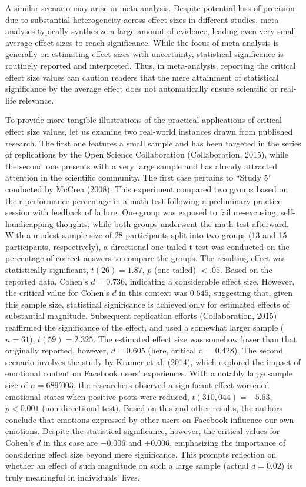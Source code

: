 \documentclass[
  man]{apa7}
\begin{document}
A similar scenario may arise in meta-analysis. Despite potential loss of precision due to substantial heterogeneity across effect sizes in different studies, meta-analyses typically synthesize a large amount of evidence, leading even very small average effect sizes to reach significance. While the focus of meta-analysis is generally on estimating effect sizes with uncertainty, statistical significance is routinely reported and interpreted. Thus, in meta-analysis, reporting the critical effect size values can caution readers that the mere attainment of statistical significance by the average effect does not automatically ensure scientific or real-life relevance.

To provide more tangible illustrations of the practical applications of critical effect size values, let us examine two real-world instances drawn from published research. The first one features a small sample and has been targeted in the series of replications by the Open Science Collaboration (Collaboration, 2015), while the second one presents with a very large sample and has already attracted attention in the scientific community. The first case pertains to ``Study 5'' conducted by McCrea (2008). This experiment compared two groups based on their performance percentage in a math test following a preliminary practice session with feedback of failure. One group was exposed to failure-excusing, self-handicapping thoughts, while both groups underwent the math test afterward. With a modest sample size of 28 participants split into two groups (13 and 15 participants, respectively), a directional one-tailed t-test was conducted on the percentage of correct answers to compare the groups. The resulting effect was statistically significant, \(t(26) = 1.87\), \(p\) (one-tailed) \(< .05\). Based on the reported data, Cohen's \(d = 0.736\), indicating a considerable effect size. However, the critical value for Cohen's \(d\) in this context was \(0.645\), suggesting that, given this sample size, statistical significance is achieved only for estimated effects of substantial magnitude. Subsequent replication efforts (Collaboration, 2015) reaffirmed the significance of the effect, and used a somewhat larger sample (\(n = 61\)), \(t(59)=2.325\). The estimated effect size was somehow lower than that originally reported, however, \(d = 0.605\) (here, critical d = 0.428). The second scenario involves the study by Kramer et al. (2014), which explored the impact of emotional content on Facebook users' experiences. With a notably large sample size of \(n = 689'003\), the researchers observed a significant effect worsened emotional states when positive posts were reduced, \(t(310,044) = −5.63\), \(p < 0.001\) (non-directional test). Based on this and other results, the authors conclude that emotions expressed by other users on Facebook influence our own emotions. Despite the statistical significance, however, the critical values for Cohen's \(d\) in this case are \(-0.006\) and \(+0.006\), emphasizing the importance of considering effect size beyond mere significance. This prompts reflection on whether an effect of such magnitude on such a large sample (actual \(d = 0.02\)) is truly meaningful in individuals' lives.
\end{document}
